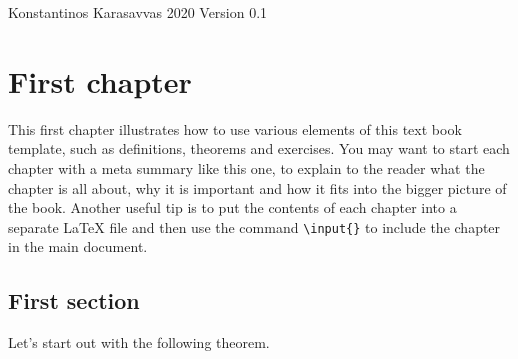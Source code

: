 \documentclass{tstextbook}
\begin{document}
       {Konstantinos Karasavvas}
       {}
       {2020}
       {}{}{}
       {Version 0.1}
       {}








\chapter{First chapter}

\begin{summary}
  This first chapter illustrates how to use various elements of this
  text book template, such as definitions, theorems and exercises. You
  may want to start each chapter with a meta summary like this one, to
  explain to the reader what the chapter is all about, why it is
  important and how it fits into the bigger picture of the
  book. Another useful tip is to put the contents of each chapter into
  a separate \LaTeX{} file and then use the command
  \texttt{\textbackslash{}input\{\}} to include the chapter in the
  main document.
\end{summary}

\section{First section}

Let's start out with the following theorem.

\end{document}
